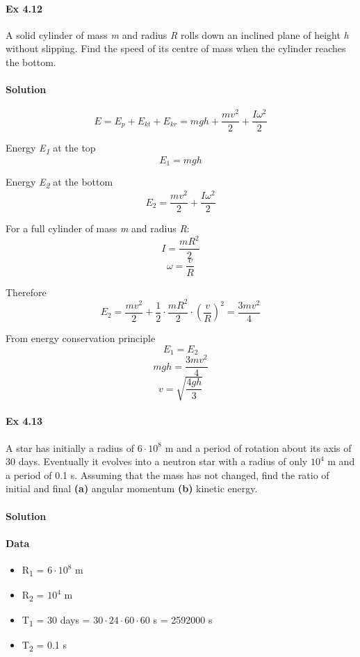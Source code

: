 \documentclass{article}
\begin{document}

\paragraph{Ex 4.12}
A solid cylinder of mass \textit{m} and radius \textit{R} rolls down an inclined plane of height \textit{h} without slipping. Find the speed of its centre of mass when the cylinder reaches the bottom.
\paragraph{Solution}

\[ E = E_p + E_{kt} + E_{kr} = m g h + \frac{m v^2}{2} + \frac{I \omega^2}{2} \]

Energy \textit{E\textsubscript{1}} at the top
\[ E_1 = m g h \]

Energy \textit{E\textsubscript{2}} at the bottom
\[ E_2 = \frac{m v^2}{2} + \frac{I \omega^2}{2} \]

For a full cylinder of mass \textit{m} and radius \textit{R}:
\[ I = \frac{m R^2}{2} \]
\[ \omega = \frac{v}{R} \]

Therefore
\[ E_2 
= \frac{m v^2}{2} + \frac{1}{2} \cdot \frac{m R^2}{2} \cdot \left( \frac{v}{R} \right) ^2
= \frac{3 m v^2}{4} \]

From energy conservation principle
\[ E_1 = E_2 \]
\[ m g h = \frac{3 m v^2}{4} \]
\[ v = \sqrt{\frac{4 g h}{3}} \]


\paragraph{Ex 4.13}
A star has initially a radius of $6 \cdot 10^8$ m and a period of rotation about its
axis of 30 days. Eventually it evolves into a neutron star with a radius of only
$10^4$ m and a period of 0.1 s. Assuming that the mass has not changed, find the
ratio of initial and final \textbf{(a)} angular momentum \textbf{(b)} kinetic energy.
\paragraph{Solution}

\paragraph{Data}
\begin{itemize}
    \item R\textsubscript{1} = $6 \cdot 10^8$ m
    \item R\textsubscript{2} = $10^4$ m
    \item T\textsubscript{1} = 30 days = $30 \cdot 24 \cdot 60 \cdot 60$ s = 2592000 s
    \item T\textsubscript{2} = 0.1 s
\end{itemize}
\end{document}
